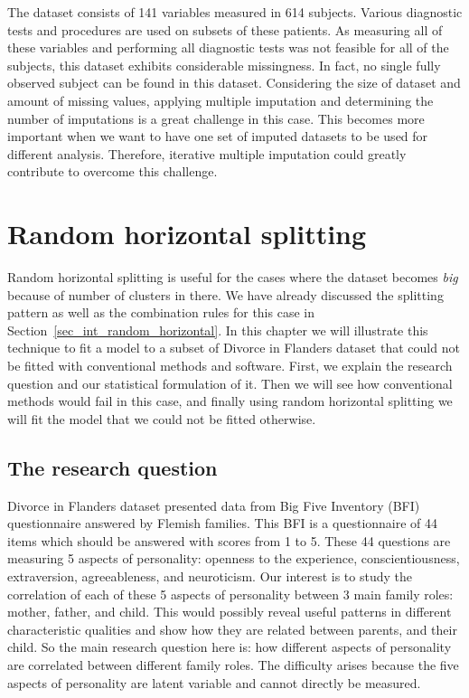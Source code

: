 \documentclass[11pt,a5paper,twoside]{book}
\begin{document}
The dataset consists of 141 variables measured in 614 subjects. Various diagnostic tests and procedures are used on subsets of these patients. As measuring all of these variables and performing all diagnostic tests was not feasible for all of the subjects, this dataset exhibits considerable missingness. In fact, no single fully observed subject can be found in this dataset. Considering the size of dataset and amount of missing values, applying multiple imputation and determining the number of imputations is a great challenge in this case. This becomes more important when we want to have one set of imputed datasets to be used for different analysis. Therefore, iterative multiple imputation could greatly contribute to overcome this challenge.





\chapter{Random horizontal splitting}

Random horizontal splitting is useful for the cases where the dataset becomes \emph{big} because of number of clusters in there. We have already discussed the splitting pattern as well as the combination rules for this case in Section~\ref{sec_int_random_horizontal}. In this chapter we will illustrate this technique to fit a model to a subset of Divorce in Flanders dataset that could not be fitted with conventional methods and software. First, we explain the research question and our statistical formulation of it. Then we will see how conventional methods would fail in this case, and finally using random horizontal splitting we will fit the model that we could not be fitted otherwise.

\section{The research question}

Divorce in Flanders dataset presented data from Big Five Inventory (BFI) questionnaire answered by Flemish families. This BFI is a questionnaire of 44 items which should be answered with scores from 1 to 5. These 44 questions are measuring 5 aspects of personality: openness to the experience, conscientiousness, extraversion, agreeableness, and neuroticism.  Our interest is to study the correlation of each of these 5 aspects of personality between 3 main family roles: mother, father, and child. This would possibly reveal useful patterns in different characteristic qualities and show how they are related between parents, and their child. So the main research question here is: how different aspects of personality are correlated between different family roles. The difficulty arises because the five aspects of personality are latent variable and cannot directly be measured.
\end{document}
